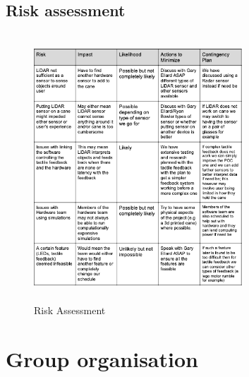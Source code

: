 \documentclass{article}
\begin{document}
\subsection{Risk assessment} 
\begin{figure}[h]
\begin{center}
  \includegraphics[width=0.7\textwidth,height=10cm]{Risk assesment.png}
  \caption{Risk Assessment}
   \end{center}
\end{figure}

\section{Group organisation}
\end{document}
